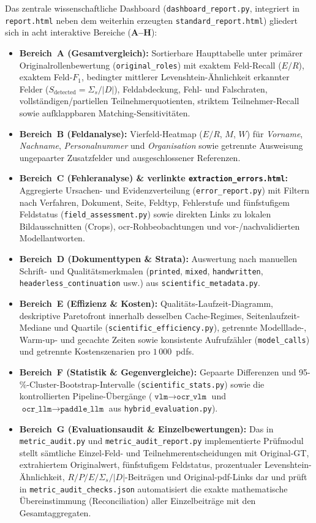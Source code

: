 Das zentrale wissenschaftliche Dashboard (\texttt{dashboard\_report.py}, integriert in \texttt{report.html} neben dem weiterhin erzeugten \texttt{standard\_report.html}) gliedert sich in acht interaktive Bereiche (\textbf{A--H}):
\begin{itemize}
  \item \textbf{Bereich~A (Gesamtvergleich):} Sortierbare Haupttabelle unter primärer Originalrollenbewertung (\texttt{original\_roles}) mit exaktem Feld-Recall ($E/R$), exaktem Feld-$F_1$, bedingter mittlerer Levenshtein-Ähnlichkeit erkannter Felder ($S_{\mathrm{detected}} = \Sigma_s / |D|$), Feldabdeckung, Fehl- und Falschraten, vollständigen/partiellen Teilnehmerquotienten, striktem Teilnehmer-Recall sowie aufklappbaren Matching-Sensitivitäten.
  \item \textbf{Bereich~B (Feldanalyse):} Vierfeld-Heatmap ($E/R$, $M$, $W$) für \emph{Vorname}, \emph{Nachname}, \emph{Personalnummer} und \emph{Organisation} sowie getrennte Ausweisung ungepaarter Zusatzfelder und ausgeschlossener Referenzen.
  \item \textbf{Bereich~C (Fehleranalyse) \& verlinkte \texttt{extraction\_errors.html}:} Aggregierte Ursachen- und Evidenzverteilung (\texttt{error\_report.py}) mit Filtern nach Verfahren, Dokument, Seite, Feldtyp, Fehlerstufe und fünfstufigem Feldstatus (\texttt{field\_assessment.py}) sowie direkten Links zu lokalen Bildausschnitten (Crops), \ac{ocr}-Rohbeobachtungen und vor-/nachvalidierten Modellantworten.
  \item \textbf{Bereich~D (Dokumenttypen \& Strata):} Auswertung nach manuellen Schrift- und Qualitätsmerkmalen (\texttt{printed}, \texttt{mixed}, \texttt{handwritten}, \texttt{headerless\_continuation} usw.) aus \texttt{scientific\_metadata.py}.
  \item \textbf{Bereich~E (Effizienz \& Kosten):} Qualitäts-Laufzeit-Diagramm, deskriptive Paretofront innerhalb desselben Cache-Regimes, Seitenlaufzeit-Mediane und Quartile (\texttt{scientific\_efficiency.py}), getrennte Modelllade-, Warm-up- und gecachte Zeiten sowie konsistente Aufrufzähler (\texttt{model\_calls}) und getrennte Kostenszenarien pro $1\,000$~\acp{pdf}.
  \item \textbf{Bereich~F (Statistik \& Gegenvergleiche):} Gepaarte Differenzen und 95-\%-Cluster-Bootstrap-Intervalle (\texttt{scientific\_stats.py}) sowie die kontrollierten Pipeline-Übergänge ($\texttt{vlm} \rightarrow \texttt{ocr\_vlm}$ und $\texttt{ocr\_llm} \rightarrow \texttt{paddle\_llm}$ aus \texttt{hybrid\_evaluation.py}).
  \item \textbf{Bereich~G (Evaluationsaudit \& Einzelbewertungen):} Das in \texttt{metric\_audit.py} und \texttt{metric\_audit\_report.py} implementierte Prüfmodul stellt sämtliche Einzel-Feld- und Teilnehmerentscheidungen mit Original-GT, extrahiertem Originalwert, fünfstufigem Feldstatus, prozentualer Levenshtein-Ähnlichkeit, $R/P/E/\Sigma_s/|D|$-Beiträgen und Original-\ac{pdf}-Links dar und prüft in \texttt{metric\_audit\_checks.json} automatisiert die exakte mathematische Übereinstimmung (Reconciliation) aller Einzelbeiträge mit den Gesamtaggregaten.
\end{itemize}

